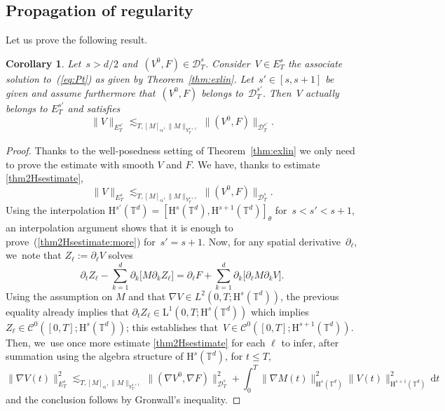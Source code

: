\documentclass[10pt]{amsart}
\newtheorem{coro}[prop]{Corollary}
\theoremstyle{definition}
\newcommand\T{\mathbb{T}}
\newcommand\dd{\mathrm{d}}
\renewcommand\H{\mathrm{H}}
\renewcommand\L{\mathrm{L}}
\begin{document}
\subsection{Propagation of regularity}
Let us prove the following result.
\begin{coro}\label{coro:thm2}
Let~$s>d/2$ and~$(V^0,F) \in \mathcal D_T^s$. Consider~$V \in E_T^s$ the associate solution to~{\rm(\ref{eq:Pt})} as given by Theorem~\ref{thm:exlin}. Let~$s' \in [s,s+1]$ be given and assume furthermore that~$(V^0,F)$ belongs to~$\mathcal D_T^{s'}$. Then~$V$ actually belongs to $E_T^{s'}$ and satisfies
\begin{equation}\label{thm2Hsestimate:more}
\| V \|_{E_T^{s'}} \lesssim_{T,[M]_{\alpha},\|M\|_{Y_T^{s+1}}} \| (V^0,F)\|_{\mathcal D_T^{s'}}.\end{equation}
\end{coro}
\begin{proof}[Proof]
Thanks to the well-posedness setting of Theorem~\ref{thm:exlin} we only need to prove the estimate with smooth $V$ and $F$.
We have, thanks to estimate \eqref{thm2Hsestimate},\vspace*{-3pt}
\[
\| V \|_{E_T^s} \lesssim_{T,[M]_{\alpha},\|M\|_{Y_T^{s+1}}} \| (V^0,F)\| _{\mathcal D_T^{s}}.
\]
Using the interpolation $\H^{s'}(\T^d) = [\H^{s}(\T^d),\H^{s+1}(\T^d)]_\theta$ for~$
s<s'<s+1$, an interpolation argument shows that it is enough to prove~(\ref{thm2Hsestimate:more}) for~$s'=s+1$.
Now, for any spatial derivative~$\partial_\ell$, we~note that $Z_\ell:=\partial_\ell V$ solves\vspace*{-3pt}
\[
\partial_t Z_\ell - \sum_{k=1}^d \partial_k \bigl[ M \partial_k Z_\ell\bigr] = \partial_\ell F + \sum_{k=1}^d \partial_k \bigl[ \partial_\ell M \partial_k V\bigr].
\]
Using the assumption on $M$ and that $\nabla V \in L^2(0,T;\H^s(\T^d))$, the previous equality already implies that $\partial_t Z_\ell \in\L^1(0,T;\H^s(\T^d))$ which implies $Z_\ell\in\mathscr{C}^0([0,T];\H^s(\T^d))$; this establishes that~$V\in\mathscr{C}^0([0,T];\H^{s+1}(\T^d))$. Then, we~use once more estimate \eqref{thm2Hsestimate} for each $\ell$ to infer, after summation using the algebra structure of $\H^s(\T^d)$, for $t\leq T$,\vspace*{-3pt}
\[
\| \nabla V(t) \|_{E_T^s}^2 \lesssim_{T,[M]_{\alpha},\|M\|_{Y_T^{s+1}}} \| (\nabla V^0,\nabla F)\|_{\mathcal D_T^{s}}^2 \!+\! \int_0^T \big \|\nabla M(t)\|_{\H^{s }(\T^d)}^2\| {V}(t)\|_{\H^{s+1}(\T^d)}^2\,\dd t
\]and the conclusion follows by Gronwall's inequality.
\end{proof}
\end{document}

